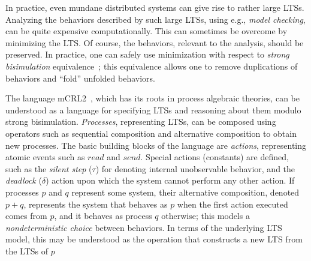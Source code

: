 \documentclass[sort&compress,preprint,3p]{elsarticle}
\begin{document}
In practice, even mundane distributed systems can give rise to rather
large LTSs. Analyzing the behaviors described by such large LTSs, using
e.g., \emph{model checking},  can be quite expensive computationally.
This can sometimes be overcome by minimizing the LTS. Of course,
the behaviors, relevant to the analysis, should be preserved. In
practice, one can safely use minimization with respect to \emph{strong
bisimulation} equivalence~\cite{Par:81}; this equivalence allows one to
remove duplications of behaviors and ``fold'' unfolded behaviors.


The language mCRL2~\cite{FormalLanguagemCRL2}, which has its roots in
process algebraic theories, can be understood as a language for specifying
LTSs and reasoning about them modulo strong bisimulation. 
\emph{Processes}, representing LTSs, can be composed using operators
such as sequential composition and alternative composition to obtain new
processes. The basic building blocks of the language are \emph{actions},
representing atomic events such as \begin{math}read\end{math} and
\begin{math}send\end{math}. Special
actions (constants) are defined, such as the \emph{silent step} (${\tau}$) for
denoting internal unobservable behavior, and the \emph{deadlock} (${\delta}$) action
upon which the system cannot perform any other action.  If processes
\begin{math}p\end{math} and \begin{math}q\end{math} represent some system,
their alternative composition, denoted \begin{math}p+q\end{math},
represents the system that behaves as \begin{math}p\end{math}
when the first action executed comes from \begin{math}p\end{math},
and it behaves as process \begin{math}q\end{math} otherwise; this
models a \emph{nondeterministic choice} between behaviors. In terms
of the underlying LTS model, this may be understood as the operation
that constructs a new LTS from the LTSs of \begin{math}p\end{math}
\end{document}
